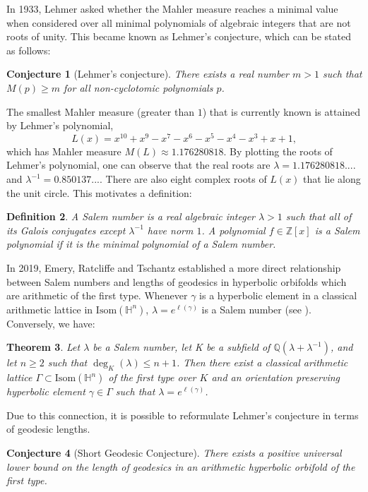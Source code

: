 \documentclass[12pt]{amsart}
\renewcommand{\H}{\mathbb{H}}
\newcommand{\Q}{\mathbb{Q}}
\newcommand{\Z}{\mathbb{Z}}
\newcommand{\Isom}{\mathrm{Isom}}
\theoremstyle{plain}
\newtheorem{theorem}{Theorem}[section]
\newtheorem{conjecture}[theorem]{Conjecture}
\newtheorem{definition}[theorem]{Definition}
\begin{document}
In 1933, Lehmer asked whether the Mahler measure reaches a minimal value when considered over all minimal polynomials of algebraic integers that are not roots of unity. This became known as Lehmer's conjecture, which can be stated as follows:

\begin{conjecture}[Lehmer's conjecture]
There exists a real number $m > 1$ such that $M(p) \geq m$ for all non-cyclotomic polynomials $p$. 
\end{conjecture}

The smallest Mahler measure (greater than $1$) that is currently known is attained by Lehmer's polynomial,
\[ L(x)=x^{10}+x^9-x^7-x^6-x^5-x^4-x^3+x+1,\]
which has Mahler measure $M(L) \approx 1.176280818$. By plotting the roots of Lehmer's polynomial, one can observe that the real roots are $\lambda = 1.176280818....$ and $\lambda^{-1} = 0.850137...$. There are also eight complex roots of $L(x)$ that lie along the unit circle. This motivates a definition: 

\begin{definition} A \emph{Salem number} is a real algebraic integer $\lambda > 1$ such that all of its Galois conjugates except $\lambda^{-1}$ have norm $1$. A polynomial $f\in\Z[x]$ is a \emph{Salem polynomial} if it is the minimal polynomial of a Salem number.
\end{definition}

In 2019, Emery, Ratcliffe and Tschantz established a more direct relationship between Salem numbers and lengths of geodesics in hyperbolic orbifolds which are arithmetic of the first type. Whenever $\gamma$ is a hyperbolic element in a classical arithmetic lattice in $\mathrm{Isom}(\H^{n})$, $\lambda=e^{\ell(\gamma)}$ is a Salem number (see ). Conversely, we have:

\begin{theorem}\cite[Theorem 6.3]{EmeryRatcliffeTschantz}
Let $\lambda$ be a Salem number, let K be a subfield of $\Q(\lambda+\lambda^{-1})$, and let $n\geq 2$ such that $\deg_K(\lambda)\leq n+1$. Then there exist a classical arithmetic lattice $\Gamma\subset\Isom(\H^n)$ of the first type over $K$ and an orientation preserving hyperbolic element $\gamma\in\Gamma$ such that $\lambda=e^{\ell(\gamma)}$.
\end{theorem}

Due to this connection, it is possible to reformulate Lehmer's conjecture in terms of geodesic lengths. 

\begin{conjecture}[Short Geodesic Conjecture]
There exists a positive universal lower bound on the length of geodesics in an arithmetic hyperbolic orbifold of the first type.
\end{conjecture}
\end{document}
